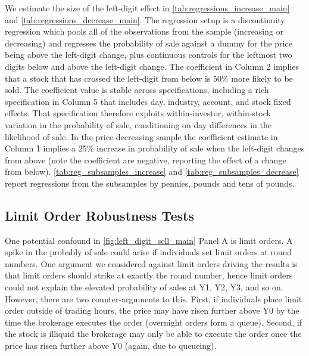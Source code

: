 We estimate the size of the left-digit effect in \ref{tab:regressions_increase_main} and \ref{tab:regressions_decrease_main}. The regression setup is a discontinuity regression which pools all of the observations from the sample (increasing or decreasing) and regresses the probability of sale against a dummy for the price being above the left-digit change, plus continuous controls for the leftmost two digits below and above the left-digit change. The coefficient in Column 2 implies that a stock that has crossed the left-digit from below is 50\% more likely to be sold. The coefficient value is stable across specifications, including a rich specification in Column 5 that includes day, industry, account, and stock fixed effects. That specification therefore exploits within-investor, within-stock variation in the probability of sale, conditioning on day differences in the likelihood of sale. In the price-decreasing sample the coefficient estimate in Column 1 implies a 25\% increase in probability of sale when the left-digit changes from above (note the coefficient are negative, reporting the effect of a change from below). \ref{tab:reg_subsamples_increase} and \ref{tab:reg_subsamples_decrease} report regressions from the subsamples by pennies, pounds and tens of pounds.

\subsection{Limit Order Robustness Tests}

One potential confound in \ref{fig:left_digit_sell_main} Panel A is limit orders. A spike in the probably of sale could arise if individuals set limit orders at round numbers. One argument we considered against limit orders driving the results is that limit orders should strike at exactly the round number, hence limit orders could not explain the elevated probability of sales at Y1, Y2, Y3, and so on. However, there are two counter-arguments to this. First, if individuals place limit order outside of trading hours, the price may have risen further above Y0 by the time the brokerage executes the order (overnight orders form a queue). Second, if the stock is illiquid the brokerage may only be able to execute the order once the price has risen further above Y0 (again, due to queueing).

